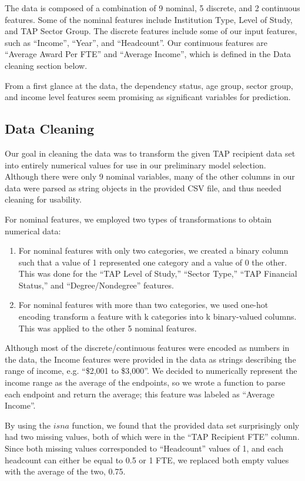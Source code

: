 \documentclass[12pt, fleqn]{article}
\begin{document}
The data is composed of a combination of 9 nominal, 5 discrete, and 2 continuous features. Some of the nominal features include Institution Type, Level of Study, and TAP Sector Group. The discrete features include some of our input features, such as ``Income'', ``Year'', and ``Headcount''. Our continuous features are ``Average Award Per FTE'' and ``Average Income'', which is defined in the Data cleaning section below.

From a first glance at the data, the dependency status, age group, sector group, and income level features seem promising as significant variables for prediction.


\subsection{Data Cleaning}
Our goal in cleaning the data was to transform the given TAP recipient data set into entirely numerical values for use in our preliminary model selection. Although there were only 9 nominal variables, many of the other columns in our data were parsed as string objects in the provided CSV file, and thus needed cleaning for usability.

For nominal features, we employed two types of transformations to obtain numerical data:
\begin{enumerate} [(1)]
	\item 
		For nominal features with only two categories, we created a binary column such that a value of 1 represented one category and a value of 0 the other. This was done for the “TAP Level of Study,” “Sector Type,” “TAP Financial Status,” and “Degree/Nondegree” features.
	\item
		For nominal features with more than two categories, we used one-hot encoding transform a feature with k categories into k binary-valued columns. This was applied to the other 5 nominal features.

\end{enumerate}

Although most of the discrete/continuous features were encoded as numbers in the data, the Income features were provided in the data as strings describing the range of income, e.g. ``\$2,001 to \$3,000''. We decided to numerically represent the income range as the average of the endpoints, so we wrote a function to parse each endpoint and return the average; this feature was labeled as ``Average Income''.

By using the $isna$ function, we found that the provided data set surprisingly only had two missing values, both of which were in the ``TAP Recipient FTE'' column. Since both missing values corresponded to ``Headcount'' values of 1, and each headcount can either be equal to 0.5 or 1 FTE, we replaced both empty values with the average of the two, 0.75.
\end{document}
